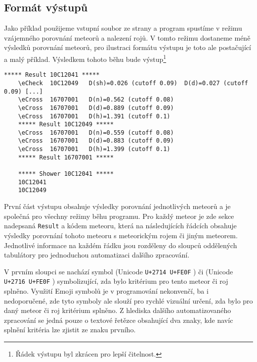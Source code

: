 \subsection{Formát výstupů}
Jako příklad použijeme vstupní soubor ze strany \pageref{code:practical:input} a program spustíme v režimu vzájemného porovnání meteorů a nalezení rojů. V tomto režimu dostaneme méně výsledků porovnání meteorů, pro ilustraci formátu výstupu je toto ale postačující a malý příklad. Výsledkem tohoto běhu bude výstup\footnote{Řádek výstupu byl zkrácen pro lepší čitelnost.}
\begin{Verbatim}[commandchars=\\\{\},gobble=4,formatcom=\footnotesize,codes={\catcode`$=3\catcode`^=7},frame=lines,reflabel=code:practical:output]
    ***** Result 10C12041 *****
    \eCheck  10C12049   D(sh)=0.026 (cutoff 0.09)  D(d)=0.027 (cutoff 0.09) [...]
    \eCross  16707001   D(n)=0.562 (cutoff 0.08)
    \eCross  16707001   D(d)=0.889 (cutoff 0.09)
    \eCross  16707001   D(h)=1.391 (cutoff 0.1)
    ***** Result 10C12049 *****
    \eCross  16707001   D(n)=0.559 (cutoff 0.08)
    \eCross  16707001   D(d)=0.883 (cutoff 0.09)
    \eCross  16707001   D(h)=1.399 (cutoff 0.1)
    ***** Result 16707001 *****
    
    ***** Shower 10C12041 *****
    10C12041
    10C12049    
\end{Verbatim}

\medskip

První část výstupu obsahuje výsledky porovnání jednotlivých meteorů a je společná pro všechny režimy běhu programu. Pro každý meteor je zde sekce nadepsaná \texttt{Result} a kódem meteoru, která na následujících řádcích obsahuje výsledky porovnání tohoto meteoru s meteorickým rojem či jiným meteorem. Jednotlivé informace na každém řádku jsou rozděleny do sloupců oddělených tabulátory pro jednoduchou automatizaci dalšího zpracování.

V prvním sloupci se nachází symbol \eCheck\hspace{4pt}(Unicode \texttt{U+2714 U+FE0F} \cite{unicode}) či \eCross\hspace{4pt}(Unicode \texttt{U+2716 U+FE0F} \cite{unicode}) symbolizující, zda bylo kritérium pro tento meteor či roj splněno. Využití Emoji symbolů je v programování nekonvenčí, ba i nedoporučené, zde tyto symboly ale slouží pro rychlé vizuální určení, zda bylo pro daný meteor či roj kritérium splněno. Z hlediska dalšího automatizovaného zpracování se jedná pouze o textové řetězce obsahující dva znaky, kde navíc splnění kritéria lze zjistit ze znaku prvního.

